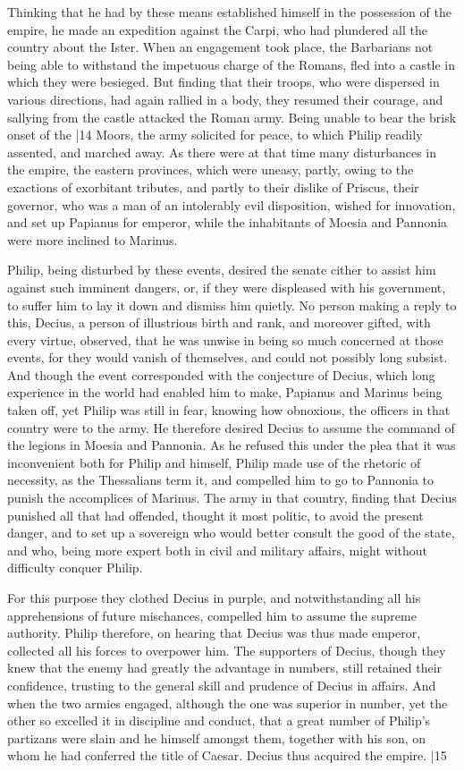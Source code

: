 Thinking that he had by these means established himself in the possession of the empire, he made an expedition against the Carpi, who had plundered all the country about the Ister. When an engagement took place, the Barbarians not being able to withstand the impetuous charge of the Romans, fled into a castle in which they were besieged. But finding that their troops, who were dispersed in various directions, had again rallied in a body, they resumed their courage, and sallying from the castle attacked the Roman army. Being unable to bear the brisk onset of the
|14 Moors, the army solicited for peace, to which Philip readily assented, and marched away. As there were at that time many disturbances in the empire, the eastern provinces, which were uneasy, partly, owing to the exactions of exorbitant tributes, and partly to their dislike of Priscus, their governor, who was a man of an intolerably evil disposition, wished for innovation, and set up Papianus for emperor, while the inhabitants of Moesia and Pannonia were more inclined to Marinus.

Philip, being disturbed by these events, desired the senate cither to assist him against such imminent dangers, or, if they were displeased with his government, to suffer him to lay it down and dismiss him quietly. No person making a reply to this, Decius, a person of illustrious birth and rank, and moreover gifted, with every virtue, observed, that he was unwise in being so much concerned at those events, for they would vanish of themselves, and could not possibly long subsist. And though the event corresponded with the conjecture of Decius, which long experience in the world had enabled him to make, Papianus and Marinus being taken off, yet Philip was still in fear, knowing how obnoxious, the officers in that country were to the army. He therefore desired Decius to assume the command of the legions in Moesia and Pannonia. As he refused this under the plea that it was inconvenient both for Philip and himself, Philip made use of the rhetoric of necessity, as the Thessalians term it, and compelled him to go to Pannonia to punish the accomplices of Marinus. The army in that country, finding that Decius punished all that had offended, thought it most politic, to avoid the present danger, and to set up a sovereign who would better consult the good of the state, and who, being more expert both in civil and military affairs, might without difficulty conquer Philip.

For this purpose they clothed Decius in purple, and notwithstanding all his apprehensions of future mischances, compelled him to assume the supreme authority. Philip therefore, on hearing that Decius was thus made emperor, collected all his forces to overpower him. The supporters of Decius, though they knew that the enemy had greatly the advantage in numbers, still retained their confidence, trusting to the general skill and prudence of Decius in affairs. And when the two armies engaged, although the one was superior in number, yet the other so excelled it in discipline and conduct, that a great number of Philip's partizans were slain and he himself amongst them, together with his son, on whom he had conferred the title of Caesar. Decius thus acquired the empire.
|15

